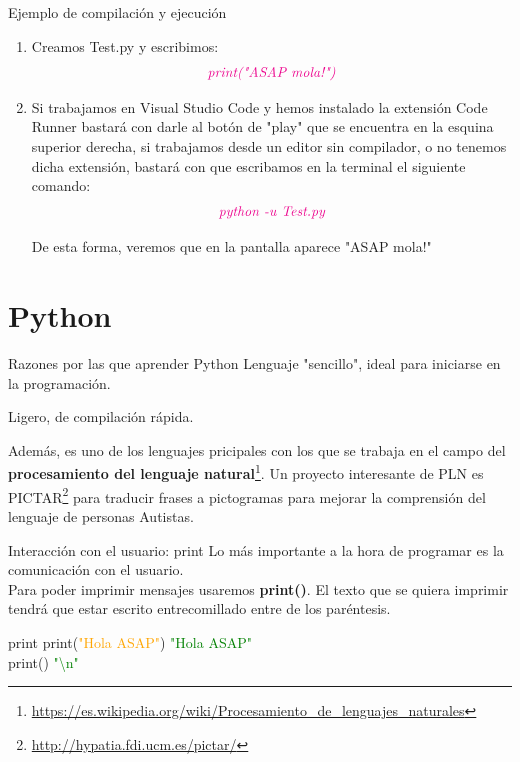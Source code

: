 \documentclass{beamer}
\begin{document}
\begin{frame}{Ejemplo de compilación y ejecución}
\begin{enumerate}
\item Creamos Test.py y escribimos: 
\begin{gather}
\color{magenta}\textit{print("ASAP mola!")}
\end{gather}
\item Si trabajamos en Visual Studio Code y hemos instalado la extensión Code Runner bastará con darle al botón de "play" que se encuentra en la esquina superior derecha, si trabajamos desde un editor sin compilador, o no tenemos dicha extensión, bastará con que escribamos en la terminal el siguiente comando:
\begin{gather}
\color{magenta}\textit{python -u Test.py}
\end{gather}

De esta forma, veremos que en la pantalla aparece "ASAP mola!"
\end{enumerate}
\end{frame}

\section{Python}

\begin{frame}{Razones por las que aprender Python}
\setlength{\parskip}{8mm} %
Lenguaje "sencillo", ideal para iniciarse en la programación.

Ligero, de compilación rápida.

Además, es uno de los lenguajes pricipales con los que se trabaja en el campo del \textbf{procesamiento del lenguaje natural}\footnote{\url{https://es.wikipedia.org/wiki/Procesamiento_de_lenguajes_naturales}}.
Un proyecto interesante de PLN es PICTAR\footnote{\url{http://hypatia.fdi.ucm.es/pictar/}} para traducir frases a pictogramas para mejorar la comprensión del lenguaje de personas Autistas.
\end{frame}

\begin{frame}{Interacción con el usuario: print}
Lo más importante a la hora de programar es la comunicación con el usuario.\\
Para poder imprimir mensajes usaremos \textbf{print()}. El texto que se quiera imprimir tendrá que estar escrito entrecomillado entre de los paréntesis.
\begin{Programexample}{print}
print(\textcolor{orange}{"Hola ASAP"}) \hspace{2cm}\textcolor{green}{"Hola ASAP"}\\
print() \hspace{4.1cm}\textcolor{green}{"\textbackslash n"}
\end{Programexample}
\end{frame}
\end{document}
